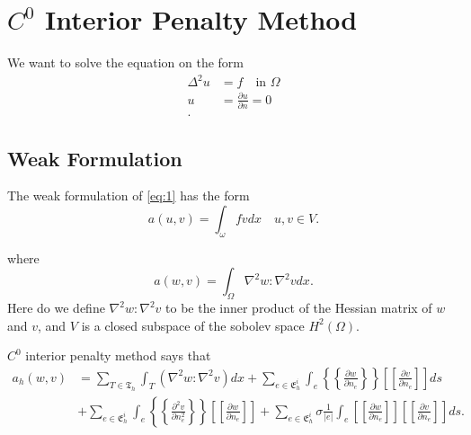 \section{$C^0$ Interior Penalty Method}\label{sec:ch1}


We want to solve the equation on the form
\begin{align}
    \label{eq:1}
    \Delta ^{2} u &= f \quad \text{in } \Omega  \\
    u &= \frac{\partial u}{\partial n} = 0  \\
.\end{align}

\subsection{Weak Formulation}%
\label{sub:weak_formulation}


The weak formulation of \eqref{eq:1} has the form
\begin{equation}
\label{eq:2}
    a\left( u,v \right) = \int_{\omega}^{} f v dx \quad u,v \in V
.\end{equation}

where
\begin{equation}
\label{eq:3}
    a\left( w,v \right) = \int_{\Omega }^{} \nabla ^2 w : \nabla ^2 v dx
.\end{equation}
Here do we define $\nabla ^2 w : \nabla ^2 v $ to be the inner product of the Hessian matrix of $w$  and $v$, and $V$
is a closed subspace of the sobolev space $H^2\left( \Omega  \right)$.

$C^{0}$ interior penalty method says that
\begin{align*}
    a_{h} \left( w,v \right) &= \sum_{T \in \mathfrak{T}_h      }^{ } \int_{T}^{} \left( \nabla ^2 w : \nabla ^2 v
    \right) dx  + \sum_{e \in \mathfrak{E}_{h}^{i} }^{} \int_{e}^{} \left\{\!\!\!\left\{ \frac{\partial w}{\partial n_{e}} \right\}\!\!\!\right\}
   \left[\!\!\left[ \frac{\partial v}{\partial n_{e}} \right]\!\!\right] ds  \\
   & +  \sum_{e \in \mathfrak{E} _{h}^{i}}^{}
   \int_{e}^{} \left\{\!\!\!\left\{ \frac{\partial ^2 v}{\partial n_e^{2} } \right\}\!\!\!\right\} \left[\!\!\left[
   \frac{\partial w }{\partial n_{e}} \right]\!\!\right] + \sum_{e \in \mathfrak{E} _{h}^{i}}^{} \sigma \frac{1}{\left\lvert
e \right\rvert }  \int_{e}^{} \left[\!\!\left[ \frac{\partial w}{\partial n_{e}} \right]\!\!\right] \left[\!\!\left[
\frac{\partial v }{\partial n_{e}} \right]\!\!\right]     ds
.\end{align*}








